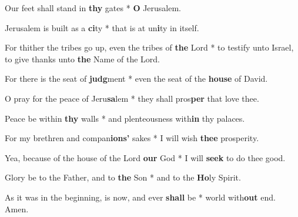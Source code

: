 \begin{multicols}{2}
	Our feet shall stand in \textbf{thy} gates * \textbf{O} Jerusalem.
	
	Jerusalem is built as a \textbf{ci}ty * that is at un\textbf{i}ty in itself.
	
	For thither the tribes go up, even the tribes of \textbf{the} Lord * to testify unto Israel, to give thanks unto \textbf{the} Name of the Lord.
	
	For there is the seat of \textbf{judg}ment * even the seat of the \textbf{house} of David.
	
	O pray for the peace of Jeru\textbf{sa}lem * they shall pros\textbf{per} that love thee.
	
	Peace be within \textbf{thy} walls * and plenteousness with\textbf{in} thy palaces.
	
	For my brethren and compan\textbf{ions'} sakes * I will wish \textbf{thee} prosperity.
	
	Yea, because of the house of the Lord \textbf{our} God * I will \textbf{seek} to do thee good.
	
	Glory be to the Father, and to \textbf{the} Son * and to the \textbf{Ho}ly Spirit.
	
	As it was in the beginning, is now, and ever \textbf{shall} be * world with\textbf{out} end. Amen.
\end{multicols}